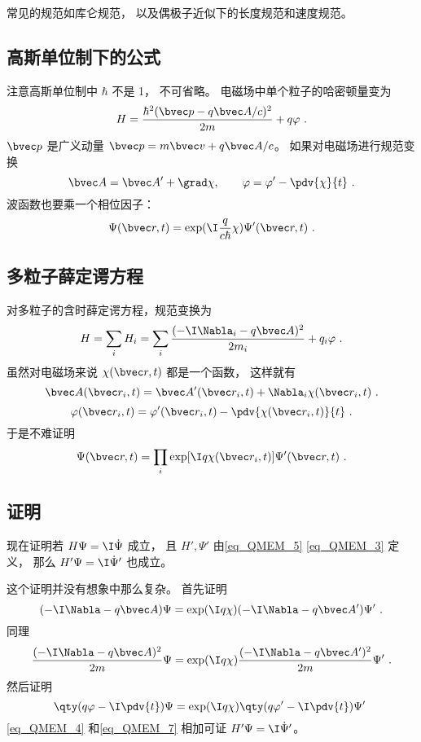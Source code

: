 常见的规范如库仑规范， 以及偶极子近似下的长度规范和速度规范。

\subsection{高斯单位制下的公式}
注意高斯单位制中 $\hbar$ 不是 1， 不可省略。 电磁场中单个粒子的哈密顿量变为
\begin{equation}
H = \frac{\hbar^2(\bvec p - q\bvec A/c)^2}{2m} + q\varphi~.
\end{equation}
$\bvec p$ 是广义动量 $\bvec p=m\bvec v+q\bvec A/c$。
如果对电磁场进行规范变换
\begin{equation}
\bvec A=\bvec A'+\grad \chi,\qquad \varphi =\varphi' - \pdv{\chi}{t}~.
\end{equation}
波函数也要乘一个相位因子：
\begin{equation}
\Psi(\bvec r,t)=\exp(\I\frac{q}{c\hbar} \chi)\Psi'(\bvec r,t)~.
\end{equation}

\subsection{多粒子薛定谔方程}
对多粒子的含时薛定谔方程，规范变换为
\begin{equation}
H = \sum_i H_i = \sum_i \frac{(-\I\Nabla_i - q\bvec A)^2}{2m_i} + q_i\varphi~.
\end{equation}
虽然对电磁场来说 $\chi(\bvec r, t)$ 都是一个函数， 这样就有
\begin{equation}
\bvec A(\bvec r_i, t) = \bvec A'(\bvec r_i, t) + \Nabla_i \chi(\bvec r_i, t)~.
\end{equation}
\begin{equation}
\varphi(\bvec r_i, t) = \varphi'(\bvec r_i, t) - \pdv{\chi(\bvec r_i, t)}{t}~.
\end{equation}
于是不难证明
\begin{equation}
\Psi(\bvec r,t)= \prod_i \exp[\I q\chi(\bvec r_i, t)]\Psi'(\bvec r,t)~.
\end{equation}

\subsection{证明}
现在证明若 $H\Psi = \I \dot\Psi$ 成立， 且 $H', \Psi'$ 由\autoref{eq_QMEM_5} \autoref{eq_QMEM_3} 定义， 那么 $H'\Psi = \I \dot\Psi'$ 也成立。

这个证明并没有想象中那么复杂。 首先证明
\begin{equation}
(-\I\Nabla - q\bvec A)\Psi = \exp(\I q\chi)(-\I\Nabla - q\bvec A')\Psi'~.
\end{equation}
同理
\begin{equation}\label{eq_QMEM_4}
\frac{(-\I\Nabla - q\bvec A)^2}{2m}\Psi = \exp(\I q\chi)\frac{(-\I\Nabla - q\bvec A')^2}{2m}\Psi'~.
\end{equation}
然后证明
\begin{equation}\label{eq_QMEM_7}
\qty(q\varphi - \I \pdv{t})\Psi= \exp(\I q\chi)\qty(q\varphi' - \I \pdv{t})\Psi'~
\end{equation}
\autoref{eq_QMEM_4} 和\autoref{eq_QMEM_7} 相加可证 $H'\Psi = \I \dot\Psi'$。
